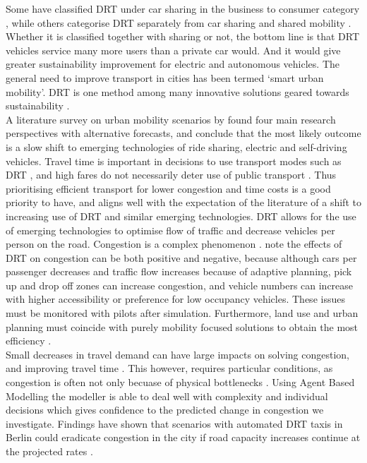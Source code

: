 \documentclass[a4paper]{article}
\begin{document}
Some have classified DRT under car sharing in the business to consumer category \citep{munzel2018carsharing}, while others categorise DRT separately from car sharing and shared mobility \citep{butler2020smart}. Whether it is classified together with sharing or not, the bottom line is that DRT vehicles service many more users than a private car would. And it would give greater sustainability improvement for electric and autonomous vehicles. The general need to improve transport in cities has been termed ‘smart urban mobility’\citep{butler2020smart}. DRT is one method among many innovative solutions geared towards sustainability \citep{butler2020smart}. \\

A literature survey on urban mobility scenarios by \citealp{miskolczi2021urban} found four main research perspectives with alternative forecasts, and conclude that the most likely outcome is a slow shift to emerging technologies of ride sharing, electric and self-driving vehicles.
Travel time is important in decisions to use transport modes such as DRT \citep{reck2020shared}, and high fares do not necessarily deter use of public transport \citep{tyrinopoulos2013factors}. Thus prioritising efficient transport for lower congestion and time costs is a good priority to have, and aligns well with the expectation of the literature of a shift to increasing use of DRT and similar emerging technologies. DRT allows for the use of emerging technologies to optimise flow of traffic and decrease vehicles per person on the road. 
Congestion is a complex phenomenon \citep{arnott1994economics}.
\citealp{butler2020smart} note the effects of DRT on congestion can be both positive and negative, because although cars per passenger decreases and traffic flow increases because of adaptive planning, pick up and drop off zones can increase congestion, and vehicle numbers can increase with higher accessibility or preference for low occupancy vehicles. These issues must be monitored with pilots after simulation. Furthermore, land use and urban planning must coincide with purely mobility focused solutions to obtain the most efficiency \citep{jabbarpour2018applications}.\\

Small decreases in  travel demand can have large impacts on solving congestion, and improving travel time \citep{vickrey1969congestion}.
This however, requires particular conditions, as congestion is often not only becuase of physical bottlenecks \citep{arnott1994economics}. Using Agent Based Modelling the modeller is able to deal well with complexity and individual decisions which gives confidence to the predicted change in congestion we investigate. Findings have shown that scenarios with automated DRT taxis in Berlin could eradicate congestion in the city if road capacity increases continue at the projected rates \citep{maciejewski2016congestion}.\\
\end{document}

